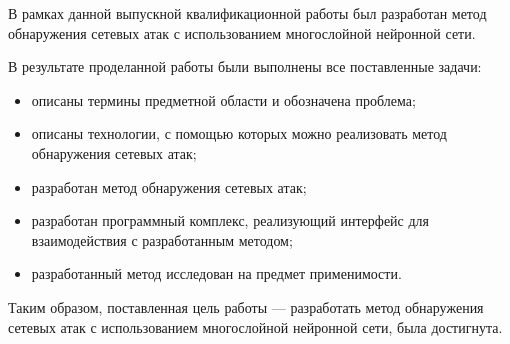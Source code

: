\conclusion

В рамках данной выпускной квалификационной работы был разработан метод обнаружения сетевых атак с использованием многослойной нейронной сети.

В результате проделанной работы были выполнены все поставленные
задачи:

\begin{itemize}
    \item описаны термины предметной области и обозначена проблема;
    \item описаны технологии, с помощью которых можно реализовать метод обнаружения сетевых атак;
	\item разработан метод обнаружения сетевых атак;
	\item разработан программный комплекс, реализующий интерфейс для взаимодействия с разработанным методом;
	\item разработанный метод исследован на предмет применимости.
\end{itemize}

Таким образом, поставленная цель работы --- разработать метод обнаружения сетевых атак с использованием многослойной нейронной сети, была достигнута.